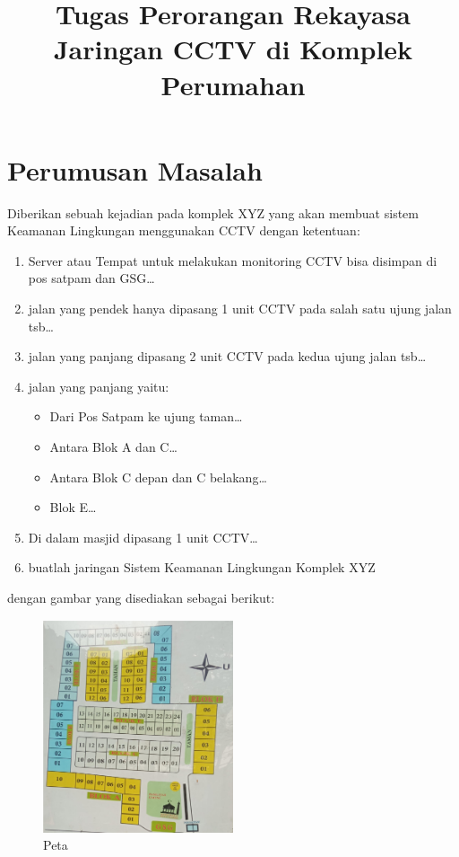 \documentclass[a4paper, 12pt]{article}
\title{\textbf{Tugas Perorangan}\linebreak
\textbf{Rekayasa Jaringan CCTV di Komplek Perumahan}\linebreak}
\date{}
\begin{document}


\clearpage
\setcounter{page}{1}
\section{Perumusan Masalah}
Diberikan sebuah kejadian pada komplek XYZ yang akan membuat sistem Keamanan Lingkungan menggunakan CCTV dengan ketentuan:
\begin{enumerate}
  \item Server atau Tempat untuk melakukan monitoring CCTV bisa disimpan di pos satpam dan GSG\dots
  \item jalan yang pendek hanya dipasang 1 unit CCTV pada salah satu ujung jalan tsb\dots
  \item jalan yang panjang dipasang 2 unit CCTV pada kedua ujung jalan tsb\dots
  \item jalan yang panjang yaitu:
    \begin{itemize}
      \item Dari Pos Satpam ke ujung taman\dots
      \item Antara Blok A dan C\dots
      \item Antara Blok C depan dan C belakang\dots
      \item Blok E\dots
      \end{itemize}
  \item Di dalam masjid dipasang 1 unit CCTV\dots
  \item buatlah jaringan Sistem Keamanan Lingkungan Komplek XYZ 
\end{enumerate}
dengan gambar yang disediakan sebagai berikut:
\begin{figure}[ht]
  \begin{center}
    \includegraphics[width=0.5\textwidth]{images/peta.png}
  \end{center}
  \caption{Peta}\label{fig:peta}
\end{figure}
\pagebreak
\end{document}
